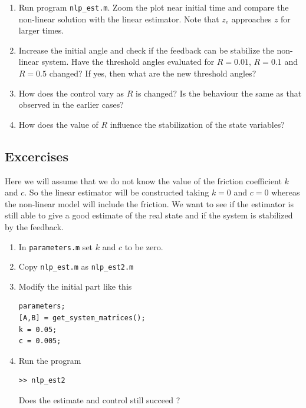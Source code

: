 \documentclass[12pt]{article}
\begin{document}
\begin{enumerate}

\item Run program {\tt nlp\_est.m}. Zoom the plot near initial time and compare the non-linear solution with the linear estimator. Note that $z_e$ approaches $z$ for larger times.

\item Increase the initial angle and check if the feedback can be stabilize the non-linear system. Have the threshold angles evaluated for $R=0.01$, $R=0.1$ and $R=0.5$ changed? If yes, then what are the new threshold angles?

\item How does the control vary as $R$ is changed? Is the behaviour the same as that observed in the earlier cases?

\item How does the value of $R$ influence the stabilization of the state variables?

\end{enumerate}
\subsection{Excercises}
Here we will assume that we do not know the value of the friction coefficient $k$ and $c$. So the linear estimator will be constructed taking $k=0$ and $c=0$ whereas the non-linear model will include the friction. We want to see if the estimator is still able to give a good estimate of the real state and if the system is stabilized by the feedback.

\begin{enumerate}

\item In {\tt parameters.m} set $k$ and $c$ to be zero.

\item Copy {\tt nlp\_est.m} as {\tt nlp\_est2.m}

\item Modify the initial part like this
\begin{lstlisting}
parameters;
[A,B] = get_system_matrices();
k = 0.05;
c = 0.005;
\end{lstlisting}

\item Run the program
\begin{lstlisting}
>> nlp_est2
\end{lstlisting}
Does the estimate and control still succeed ?

\end{enumerate}
\end{document}
